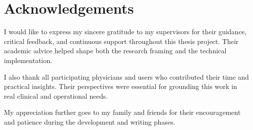 \chapter*{Acknowledgements}

I would like to express my sincere gratitude to my supervisors for their guidance, critical feedback, and continuous support throughout this thesis project. Their academic advice helped shape both the research framing and the technical implementation.

I also thank all participating physicians and users who contributed their time and practical insights. Their perspectives were essential for grounding this work in real clinical and operational needs.

My appreciation further goes to my family and friends for their encouragement and patience during the development and writing phases.
